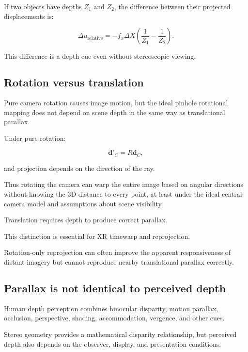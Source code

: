 If two objects have depths \(Z_1\) and \(Z_2\), the difference between their projected displacements is:

\[ \boxed{ \Delta u_{\mathrm{relative}} = -f_x\Delta X \left( \frac1{Z_1}-\frac1{Z_2} \right). } \]

This difference is a depth cue even without stereoscopic viewing.

\subsection{Rotation versus translation}\label{02-foundations-ii-ch035-rotation-versus-translation}

\hypertarget{02-foundations-ii-ch035-rotation-versus-translation}{}

Pure camera rotation causes image motion, but the ideal pinhole rotational mapping does not depend on scene depth in the same way as translational parallax.

Under pure rotation:

\[ \mathbf d'_C=R\mathbf d_C, \]

and projection depends on the direction of the ray.

Thus rotating the camera can warp the entire image based on angular directions without knowing the 3D distance to every point, at least under the ideal central-camera model and assumptions about scene visibility.

Translation requires depth to produce correct parallax.

This distinction is essential for XR timewarp and reprojection.

Rotation-only reprojection can often improve the apparent responsiveness of distant imagery but cannot reproduce nearby translational parallax correctly.

\subsection{Parallax is not identical to perceived depth}\label{02-foundations-ii-ch035-parallax-is-not-identical-to-perceived-depth}

\hypertarget{02-foundations-ii-ch035-parallax-is-not-identical-to-perceived-depth}{}

Human depth perception combines binocular disparity, motion parallax, occlusion, perspective, shading, accommodation, vergence, and other cues.

Stereo geometry provides a mathematical disparity relationship, but perceived depth also depends on the observer, display, and presentation conditions.

